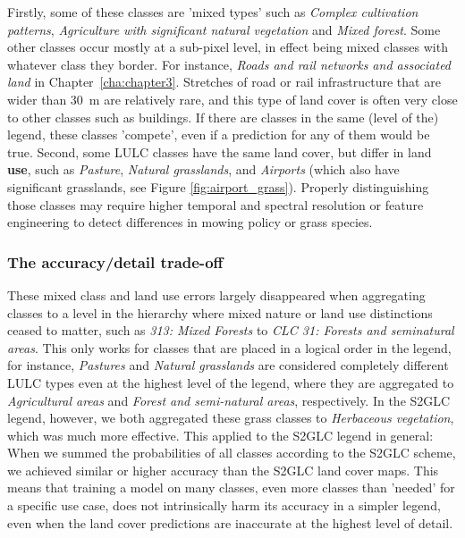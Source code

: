         Firstly, some of these classes are 'mixed types' such as \textit{Complex cultivation patterns}, \textit{Agriculture with significant natural vegetation} and \textit{Mixed forest}. Some other classes occur mostly at a sub-pixel level, in effect being mixed classes with whatever class they border. For instance, \textit{Roads and rail networks and associated land} in Chapter\@~\ref{cha:chapter3}. Stretches of road or rail infrastructure that are wider than 30~m are relatively rare, and this type of land cover is often very close to other classes such as buildings. If there are classes in the same (level of the) legend, these classes 'compete', even if a prediction for any of them would be true. 
        Second, some LULC classes have the same land cover, but differ in land \textbf{use}, such as \textit{Pasture}, \textit{Natural grasslands}, and \textit{Airports} (which also have significant grasslands, see Figure \ref{fig:airport_grass}). Properly distinguishing those classes may require higher temporal and spectral resolution or feature engineering to detect differences in mowing policy or grass species. 

        \subsubsection{The accuracy/detail trade-off}
        
            These mixed class and land use errors largely disappeared when aggregating classes to a level in the hierarchy where mixed nature or land use distinctions ceased to matter, such as \textit{313: Mixed Forests} to \textit{CLC 31: Forests and seminatural areas}. This only works for classes that are placed in a logical order in the legend, for instance, \textit{Pastures} and \textit{Natural grasslands} are considered completely different LULC types even at the highest level of the legend, where they are aggregated to \textit{Agricultural areas} and \textit{Forest and semi-natural areas}, respectively. In the S2GLC legend, however, we both aggregated these grass classes to \textit{Herbaceous vegetation}, which was much more effective. This applied to the S2GLC legend in general: When we summed the probabilities of all classes according to the S2GLC scheme, we achieved similar or higher accuracy than the S2GLC land cover maps. This means that training a model on many classes, even more classes than 'needed' for a specific use case, does not intrinsically harm its accuracy in a simpler legend, even when the land cover predictions are inaccurate at the highest level of detail.

